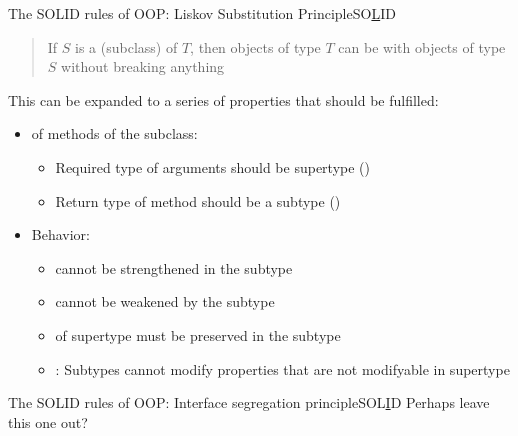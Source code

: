 \begin{frame}{The SOLID rules of OOP: Liskov Substitution Principle}{SO\underline  LID}
	\begin{quote}
		If $S$ is a  (subclass) of $T$, then objects of type $T$ can be  with objects of type $S$ without breaking anything
	\end{quote}
	This can be expanded to a series of properties that should be fulfilled:
	\begin{itemize}
		\item {} of methods of the subclass:
		\begin{itemize}
			\item 
			Required type of arguments should be supertype ()\\
			\item 
			Return type of method should be a subtype ()\\
		\end{itemize}
	\item Behavior:
		\begin{itemize}
		\item
		  cannot be strengthened in the subtype\\
		\item 
		 cannot be weakened by the subtype
		\item 
		  of supertype must be preserved in the subtype
		\item 
		: Subtypes cannot modify properties that are not modifyable in supertype\\
		\end{itemize}
	\end{itemize}
\end{frame}

\begin{frame}{The SOLID rules of OOP: Interface segregation principle}{SOL\underline  ID}
	Perhaps leave this one out? 
\end{frame}

